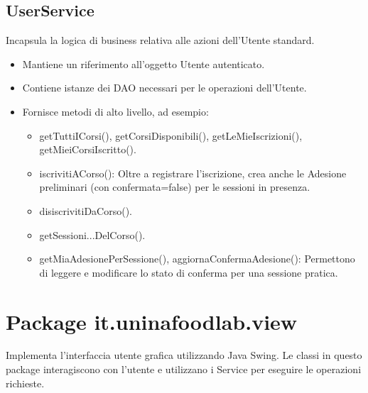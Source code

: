 \documentclass[a4paper, 12pt]{article}
\begin{document}
\subsection{UserService}
Incapsula la logica di business relativa alle azioni dell'Utente standard.
\begin{itemize}
    \item Mantiene un riferimento all'oggetto Utente autenticato.
    \item Contiene istanze dei DAO necessari per le operazioni dell'Utente.
    \item Fornisce metodi di alto livello, ad esempio:
        \begin{itemize}
            \item getTuttiICorsi(), getCorsiDisponibili(), getLeMieIscrizioni(), getMieiCorsiIscritto().
            \item iscrivitiACorso(): Oltre a registrare l'iscrizione, crea anche le Adesione preliminari (con confermata=false) per le sessioni in presenza.
            \item disiscrivitiDaCorso().
            \item getSessioni...DelCorso().
            \item getMiaAdesionePerSessione(), aggiornaConfermaAdesione(): Permettono di leggere e modificare lo stato di conferma per una sessione pratica.
        \end{itemize}
\end{itemize}

\section{Package it.uninafoodlab.view}
Implementa l'interfaccia utente grafica utilizzando Java Swing. Le classi in questo package interagiscono con l'utente e utilizzano i Service per eseguire le operazioni richieste.
\end{document}
